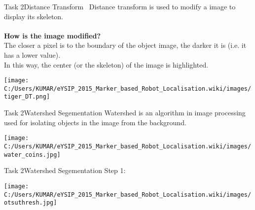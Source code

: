 \documentclass[10pt, a4paper]{beamer}
\begin{document}
\begin{frame}{Task 2}{Distance Transform}
	\
	Distance transform is used to modify a image to display its skeleton.\\ \ \\
	\textbf{How is the image modified?}\\
	The closer a pixel is to the boundary of the object image, the darker it is (i.e. it has a lower value).\\
	In this way, the center (or the skeleton) of the image is highlighted.
	\begin{minipage}{0.5\textwidth}
		\centering
		\texttt{[image: C:/Users/KUMAR/eYSIP\_2015\_Marker\_based\_Robot\_Localisation.wiki/images/tiger\_DT.png]}
		\label{fig:sfig4}
		
		
	\end{minipage}		
	
\end{frame}



\begin{frame}{Task 2}{Watershed Segementation}
	Watershed is an algorithm in image processing used for isolating objects in the image from the background.
	\begin{minipage}{0.5\textwidth}
		\centering
		\texttt{[image: C:/Users/KUMAR/eYSIP\_2015\_Marker\_based\_Robot\_Localisation.wiki/images/water\_coins.jpg]}
		\label{fig:sfig4}
		
		
	\end{minipage}		
	
\end{frame}		
\begin{frame}{Task 2}{Watershed Segementation}
Step 1: 

	\begin{minipage}{0.5\textwidth}
		\centering
		\texttt{[image: C:/Users/KUMAR/eYSIP\_2015\_Marker\_based\_Robot\_Localisation.wiki/images/otsuthresh.jpg]}
		\label{fig:sfig4}
		
		
	\end{minipage}		
	
\end{frame}		
		
\end{document}

